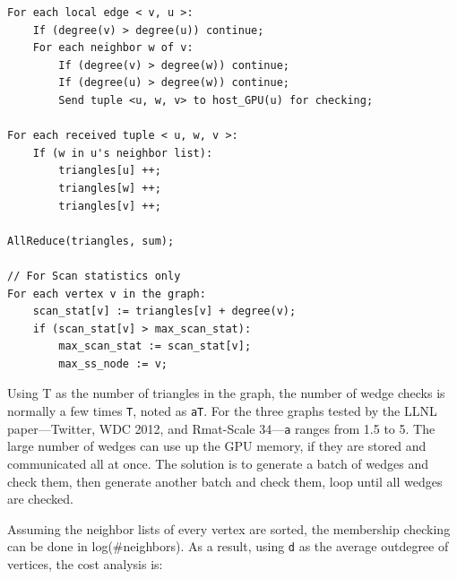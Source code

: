 \documentclass[10pt,oneside]{memoir}
\begin{document}
\begin{verbatim}
For each local edge < v, u >:
    If (degree(v) > degree(u)) continue;
    For each neighbor w of v:
        If (degree(v) > degree(w)) continue;
        If (degree(u) > degree(w)) continue;
        Send tuple <u, w, v> to host_GPU(u) for checking;

For each received tuple < u, w, v >:
    If (w in u's neighbor list):
        triangles[u] ++;
        triangles[w] ++;
        triangles[v] ++;

AllReduce(triangles, sum);

// For Scan statistics only
For each vertex v in the graph:
    scan_stat[v] := triangles[v] + degree(v);
    if (scan_stat[v] > max_scan_stat):
        max_scan_stat := scan_stat[v];
        max_ss_node := v;
\end{verbatim}

Using T as the number of triangles in the graph, the number of wedge
checks is normally a few times \texttt{T}, noted as \texttt{aT}. For the
three graphs tested by the LLNL paper---Twitter, WDC 2012, and
Rmat-Scale 34---\texttt{a} ranges from 1.5 to 5. The large number of
wedges can use up the GPU memory, if they are stored and communicated
all at once. The solution is to generate a batch of wedges and check
them, then generate another batch and check them, loop until all wedges
are checked.

Assuming the neighbor lists of every vertex are sorted, the membership
checking can be done in log(\#neighbors). As a result, using \texttt{d}
as the average outdegree of vertices, the cost analysis is:
\end{document}
